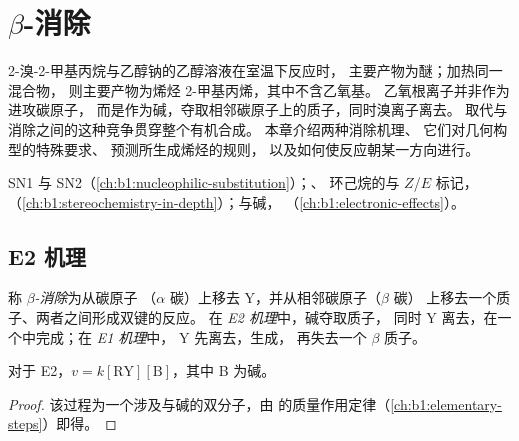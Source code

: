 \chapter{\texorpdfstring{$\beta$}{贝塔}-消除}\label{ch:b1:elimination}

2-溴-2-甲基丙烷与乙醇钠的乙醇溶液在室温下反应时，
主要产物为醚；加热同一混合物，
则主要产物为烯烃 2-甲基丙烯，其中不含乙氧基。
乙氧根离子并非作为进攻碳原子，
而是作为碱，夺取相邻碳原子上的质子，同时溴离子离去。
取代与消除之间的这种竞争贯穿整个有机合成。
本章介绍两种消除机理、
它们对几何构型的特殊要求、
预测所生成烯烃的规则，
以及如何使反应朝某一方向进行。

\begin{recall}
SN1 与 SN2（\cref{ch:b1:nucleophilic-substitution}）；、
环己烷的与 $Z$/$E$ 标记，
（\cref{ch:b1:stereochemistry-in-depth}）；与碱，
（\cref{ch:b1:electronic-effects}）。
\end{recall}

\section{E2 机理}

\begin{definition}\label{def:b1:elimination:elimination}
称 \emph{$\beta$-消除}为从碳原子
（$\alpha$ 碳）上移去 Y，并从相邻碳原子（$\beta$ 碳）
上移去一个质子、两者之间形成双键的反应。
在 \emph{E2 机理}中，碱夺取质子，
同时 Y 离去，在一个中完成；在 \emph{E1 机理}中，
Y 先离去，生成，
再失去一个 $\beta$ 质子。
\end{definition}

\begin{proposition}[E2 的速率方程]\label{prop:b1:elimination:e2-law}
对于 E2，$v = k[\mathrm{RY}][\mathrm{B}]$，其中 B 为碱。
\end{proposition}

\begin{proof}
该过程为一个涉及与碱的双分子，由
的质量作用定律（\cref{ch:b1:elementary-steps}）即得。
\end{proof}

